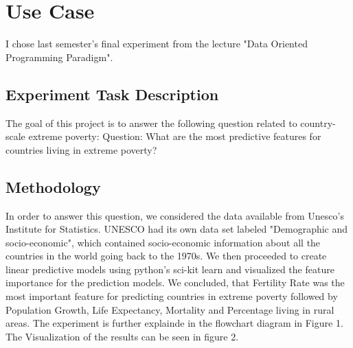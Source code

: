 \documentclass[12pt]{article}
\begin{document}
\graphicspath{ {./} }

\section{Use Case}
I chose last semester's final experiment from the lecture "Data Oriented Programming Paradigm".

\subsection{Experiment Task Description}
The goal of this project is to answer the following question related to country-scale extreme poverty: \newline
    Question: What are the most predictive features for countries living in extreme poverty?

\subsection{Methodology}
In order to answer this question, we considered the data available from Unesco's Institute for Statistics. UNESCO had its own data set labeled "Demographic and socio-economic", which contained socio-economic information about all the countries in the world going back to the 1970s.
We then proceeded to create linear predictive models using python's sci-kit learn and visualized the feature importance for the prediction models. \newline
We concluded, that Fertility Rate was the most important feature for predicting countries in extreme poverty followed by Population Growth, Life Expectancy, Mortality and Percentage living in rural areas. \newline
The experiment is further explainde in the flowchart diagram in Figure 1. \newline
The Visualization of the results can be seen in figure 2.
\end{document}
